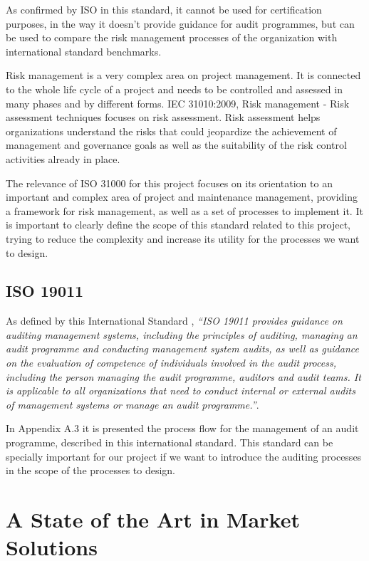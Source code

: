 As confirmed by ISO in this standard, it cannot be used for certification purposes, in the way it doesn't provide guidance for audit programmes, but can be used to compare the risk management processes of the organization with international standard benchmarks.\par
Risk management is a very complex area on project management. It is connected to the whole life cycle of a project and needs to be controlled and assessed in many phases and by different forms. IEC 31010:2009, Risk management - Risk assessment techniques focuses on risk assessment. Risk assessment helps organizations understand the risks that could jeopardize the achievement of management and governance goals as well as the suitability of the risk control activities already in place.\cite{IEC31010}\par
The relevance of ISO 31000 for this project focuses on its orientation to an important and complex area of project and maintenance management, providing a framework for risk management, as well as a set of processes to implement it. It is important to clearly define the scope of this standard related to this project, trying to reduce the complexity and increase its utility for the processes we want to design.


\subsection{ISO 19011}

As defined by this International Standard \cite{ISO19011}, \textit{``ISO 19011 provides guidance on auditing management systems, including the principles of auditing, managing an audit programme and conducting management system audits, as well as guidance on the evaluation of competence of individuals involved in the audit process, including the person managing the audit programme, auditors and audit teams. It is applicable to all organizations that need to conduct internal or external audits of management systems or manage an audit programme.''}.\par
In Appendix A.3 it is presented the process flow for the management of an audit programme, described in this international standard. This standard can be specially important for our project if we want to introduce the auditing processes in the scope of the processes to design.\par


\section{A State of the Art in Market Solutions}

